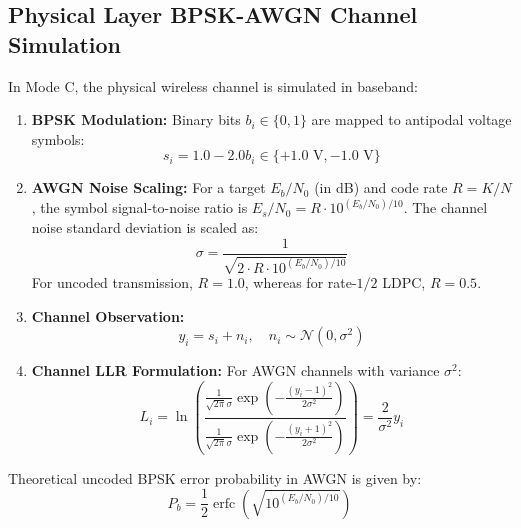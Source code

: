 \documentclass[conference]{IEEEtran}
\begin{document}
\subsection{Physical Layer BPSK-AWGN Channel Simulation}
In Mode C, the physical wireless channel is simulated in baseband:
\begin{enumerate}
    \item \textbf{BPSK Modulation:} Binary bits $b_i \in \{0, 1\}$ are mapped to antipodal voltage symbols:
    \begin{equation}
    s_i = 1.0 - 2.0 b_i \in \{+1.0\text{ V}, -1.0\text{ V}\}
    \end{equation}
    \item \textbf{AWGN Noise Scaling:} For a target $E_b/N_0$ (in dB) and code rate $R = K/N$, the symbol signal-to-noise ratio is $E_s/N_0 = R \cdot 10^{(E_b/N_0)/10}$. The channel noise standard deviation is scaled as:
    \begin{equation}
    \sigma = \frac{1}{\sqrt{2 \cdot R \cdot 10^{(E_b/N_0)/10}}}
    \end{equation}
    For uncoded transmission, $R=1.0$, whereas for rate-$1/2$ LDPC, $R=0.5$.
    \item \textbf{Channel Observation:}
    \begin{equation}
    y_i = s_i + n_i, \quad n_i \sim \mathcal{N}(0, \sigma^2)
    \end{equation}
    \item \textbf{Channel LLR Formulation:} For AWGN channels with variance $\sigma^2$:
    \begin{equation}
    L_i = \ln \left( \frac{\frac{1}{\sqrt{2\pi}\sigma} \exp \left( -\frac{(y_i - 1)^2}{2\sigma^2} \right)}{\frac{1}{\sqrt{2\pi}\sigma} \exp \left( -\frac{(y_i + 1)^2}{2\sigma^2} \right)} \right) = \frac{2}{\sigma^2} y_i
    \end{equation}
\end{enumerate}

Theoretical uncoded BPSK error probability in AWGN is given by:
\begin{equation}
P_b = \frac{1}{2} \operatorname{erfc} \left( \sqrt{10^{(E_b/N_0)/10}} \right)
\end{equation}
\end{document}

